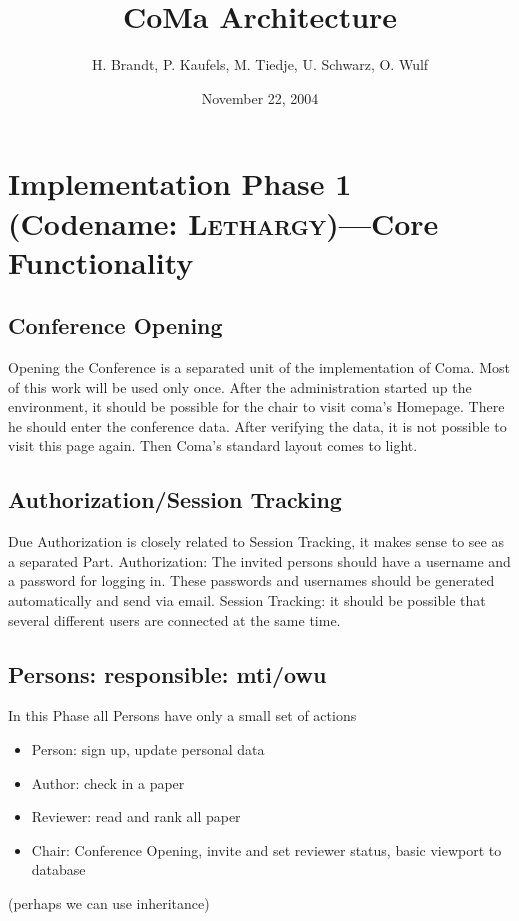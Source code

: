 \documentclass[a4paper]{article}
\title{CoMa Architecture}
\date{November 22, 2004}
\author{H. Brandt, P. Kaufels, M. Tiedje, U. Schwarz, O. Wulf}
\begin{document}
\maketitle
\tableofcontents

\section{Implementation Phase 1 (Codename: \textsc{Lethargy})---Core Functionality}
  \subsection{Conference Opening} \label{sec:1:opening}
  Opening the Conference is a separated unit of the implementation of Coma. 
Most of this work will be used only once.
  After the administration started up the environment, it should be possible for the chair
to visit coma's Homepage. There he should enter the conference data. After verifying the data, it is not possible to visit this page again. Then Coma's standard layout comes to light.
\subsection{Authorization/Session Tracking}\label{sec:1:authorization}
Due Authorization is closely related to Session Tracking, it makes sense to see as a separated Part.
Authorization: The invited persons should have a username and a password for logging in.
These passwords and usernames should be generated automatically and send via email.
Session Tracking: it should be possible that several different users are connected at the same time.

	\subsection{Persons: responsible: mti/owu}\label{sec:1:persons}
  In this Phase all Persons have only a small set of actions
  \begin{itemize}
  	\item Person: sign up, update personal data
  	\item Author: check in a paper
  	\item Reviewer: read and rank all paper
  	\item Chair: Conference Opening, invite and set reviewer status, basic viewport to database
  \end{itemize}
 (perhaps we can use inheritance)
\end{document}
